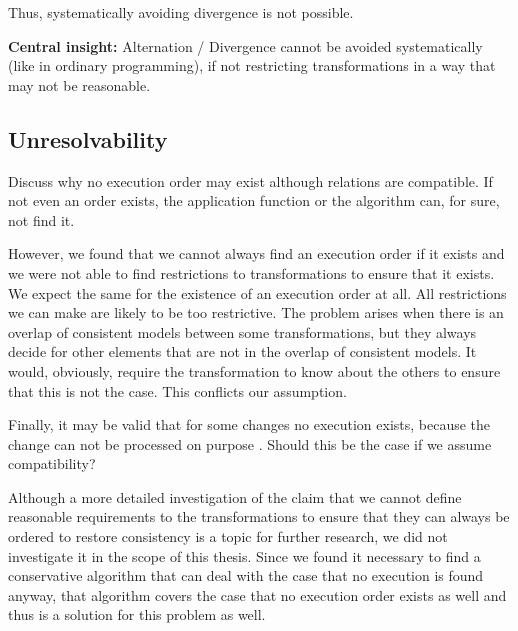 Thus, systematically avoiding divergence is not possible. 

\textbf{Central insight:} Alternation / Divergence cannot be avoided systematically (like in ordinary programming), if not restricting transformations in a way that may not be reasonable.



\subsection{Unresolvability}

Discuss why no execution order may exist although relations are compatible.
If not even an order exists, the application function or the algorithm can, for sure, not find it.

However, we found that we cannot always find an execution order if it exists and we were not able to find restrictions to transformations to ensure that it exists.
We expect the same for the existence of an execution order at all.
All restrictions we can make are likely to be too restrictive.
The problem arises when there is an overlap of consistent models between some transformations, but they always decide for other elements that are not in the overlap of consistent models.
It would, obviously, require the transformation to know about the others to ensure that this is not the case.
This conflicts our assumption.

Finally, it may be valid that for some changes no execution exists, because the change can not be processed on purpose .
Should this be the case if we assume compatibility?

Although a more detailed investigation of the claim that we cannot define reasonable requirements to the transformations to ensure that they can always be ordered to restore consistency is a topic for further research, we did not investigate it in the scope of this thesis.
Since we found it necessary to find a conservative algorithm that can deal with the case that no execution is found anyway, that algorithm covers the case that no execution order exists as well and thus is a solution for this problem as well.

